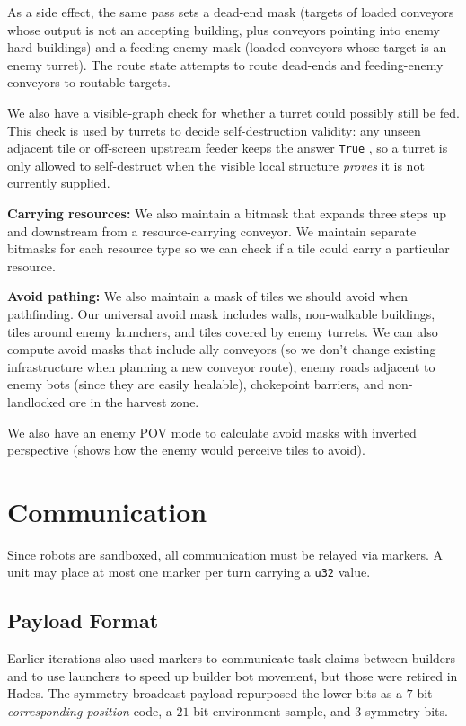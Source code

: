 \documentclass[10pt,sigconf,nonacm]{acmart}
\newcommand{\code}[1]{{%
  \def\_{\char`\_\discretionary{}{}{}}%
  \texttt{\small #1}%
}}
\begin{document}
As a side effect, the same pass sets a dead-end mask (targets
of loaded conveyors whose output is not an accepting building, plus
conveyors pointing into enemy hard buildings) and a feeding-enemy mask
(loaded conveyors whose target is an enemy
turret). The route state attempts to route dead-ends and feeding-enemy conveyors to routable targets.

We also have a visible-graph check for whether a turret could possibly
still be fed. This check is used by turrets to decide
self-destruction validity: any unseen adjacent tile or off-screen upstream feeder
keeps the answer \code{True}, so a turret is only allowed to self-destruct when the visible
local structure \emph{proves} it is not currently supplied.

\textbf{Carrying resources:} We also maintain a bitmask that expands three steps up and downstream from a resource-carrying conveyor. We maintain separate bitmasks for each resource type so we can check if a tile could carry a particular resource.

\textbf{Avoid pathing:} We also maintain a mask of tiles we should avoid when pathfinding. Our universal avoid mask includes walls, non-walkable buildings, tiles around enemy launchers, and tiles covered by enemy turrets. We can also compute avoid masks that include ally conveyors (so we don't change existing infrastructure when planning a new conveyor route), enemy roads adjacent to enemy bots (since they are easily healable), chokepoint barriers, and non-landlocked ore in the harvest zone.

We also have an enemy POV mode to calculate avoid masks with inverted perspective (shows how the enemy
would perceive tiles to avoid).

\section{Communication}

Since robots are sandboxed, all communication must be relayed via markers.
A unit may place at most one marker per turn carrying a \code{u32} value.

\subsection{Payload Format}

Earlier iterations also used markers to communicate task claims between
builders and to use launchers to speed up builder bot movement, but those were retired in Hades.
The symmetry-broadcast payload repurposed the lower bits as a
$7$-bit \emph{corresponding-position} code, a $21$-bit environment sample,
and $3$ symmetry bits.
\end{document}
